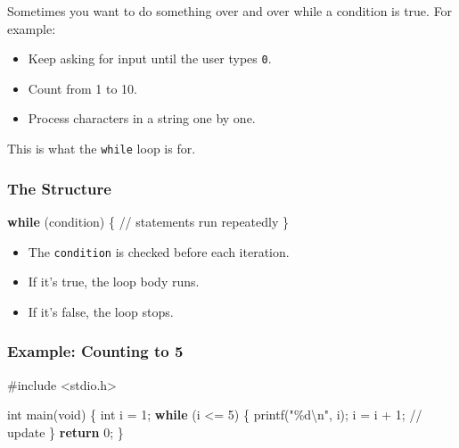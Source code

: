 \documentclass[
  letterpaper,
  DIV=11,
  numbers=noendperiod]{scrreprt}
\newenvironment{Shaded}{\begin{snugshade}}{\end{snugshade}}
\newcommand{\CommentTok}[1]{\textcolor[rgb]{0.37,0.37,0.37}{#1}}
\newcommand{\ControlFlowTok}[1]{\textcolor[rgb]{0.00,0.23,0.31}{\textbf{#1}}}
\newcommand{\DataTypeTok}[1]{\textcolor[rgb]{0.68,0.00,0.00}{#1}}
\newcommand{\DecValTok}[1]{\textcolor[rgb]{0.68,0.00,0.00}{#1}}
\newcommand{\ImportTok}[1]{\textcolor[rgb]{0.00,0.46,0.62}{#1}}
\newcommand{\NormalTok}[1]{\textcolor[rgb]{0.00,0.23,0.31}{#1}}
\newcommand{\OperatorTok}[1]{\textcolor[rgb]{0.37,0.37,0.37}{#1}}
\newcommand{\PreprocessorTok}[1]{\textcolor[rgb]{0.68,0.00,0.00}{#1}}
\newcommand{\SpecialCharTok}[1]{\textcolor[rgb]{0.37,0.37,0.37}{#1}}
\newcommand{\StringTok}[1]{\textcolor[rgb]{0.13,0.47,0.30}{#1}}
\providecommand{\tightlist}{%
  \setlength{\itemsep}{0pt}\setlength{\parskip}{0pt}}
\begin{document}
Sometimes you want to do something over and over while a condition is
true. For example:

\begin{itemize}
\tightlist
\item
  Keep asking for input until the user types \texttt{0}.
\item
  Count from 1 to 10.
\item
  Process characters in a string one by one.
\end{itemize}

This is what the \texttt{while} loop is for.

\subsubsection{The Structure}\label{the-structure-1}

\begin{Shaded}
\begin{Highlighting}[]
\ControlFlowTok{while} \OperatorTok{(}\NormalTok{condition}\OperatorTok{)} \OperatorTok{\{}
    \CommentTok{// statements run repeatedly}
\OperatorTok{\}}
\end{Highlighting}
\end{Shaded}

\begin{itemize}
\tightlist
\item
  The \texttt{condition} is checked before each iteration.
\item
  If it's true, the loop body runs.
\item
  If it's false, the loop stops.
\end{itemize}

\subsubsection{Example: Counting to 5}\label{example-counting-to-5}

\begin{Shaded}
\begin{Highlighting}[]
\PreprocessorTok{\#include }\ImportTok{\textless{}stdio.h\textgreater{}}

\DataTypeTok{int}\NormalTok{ main}\OperatorTok{(}\DataTypeTok{void}\OperatorTok{)} \OperatorTok{\{}
    \DataTypeTok{int}\NormalTok{ i }\OperatorTok{=} \DecValTok{1}\OperatorTok{;}
    \ControlFlowTok{while} \OperatorTok{(}\NormalTok{i }\OperatorTok{\textless{}=} \DecValTok{5}\OperatorTok{)} \OperatorTok{\{}
\NormalTok{        printf}\OperatorTok{(}\StringTok{"}\SpecialCharTok{\%d\textbackslash{}n}\StringTok{"}\OperatorTok{,}\NormalTok{ i}\OperatorTok{);}
\NormalTok{        i }\OperatorTok{=}\NormalTok{ i }\OperatorTok{+} \DecValTok{1}\OperatorTok{;}  \CommentTok{// update}
    \OperatorTok{\}}
    \ControlFlowTok{return} \DecValTok{0}\OperatorTok{;}
\OperatorTok{\}}
\end{Highlighting}
\end{Shaded}
\end{document}
